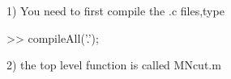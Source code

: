 1) You need to first compile the .c files,type

>> compileAll('.');

2) the top level function is called MNcut.m




